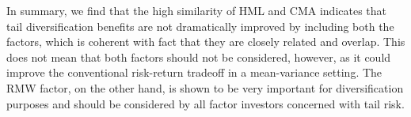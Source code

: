 In summary, we find that the high similarity of HML and CMA indicates that tail diversification benefits are not dramatically improved by including both the factors, which is coherent with fact that they are closely related and overlap. This does not mean that both factors should not be considered, however, as it could improve the conventional risk-return tradeoff in a mean-variance setting. The RMW factor, on the other hand, is shown to be very important for diversification purposes and should be considered by all factor investors concerned with tail risk.

